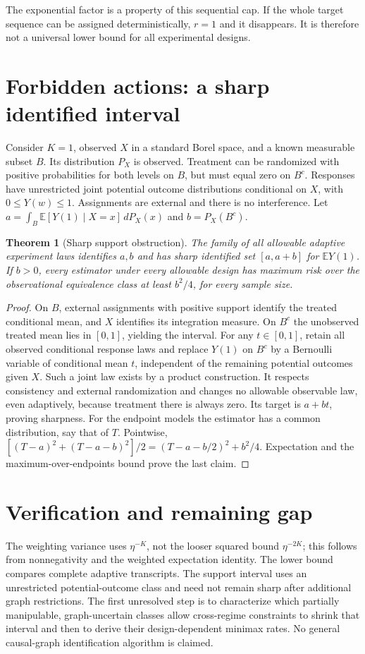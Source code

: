 \documentclass[11pt]{article}
\newtheorem{theorem}{Theorem}
\theoremstyle{remark}
\newcommand{\E}{\mathbb E}
\begin{document}
The exponential factor is a property of this sequential cap. If the whole
target sequence can be assigned deterministically, $r=1$ and it disappears.
It is therefore not a universal lower bound for all experimental designs.

\section{Forbidden actions: a sharp identified interval}
Consider $K=1$, observed $X$ in a standard Borel space, and a known
measurable subset $B$. Its distribution $P_X$ is observed. Treatment can
be randomized with positive probabilities for both levels on $B$, but
must equal zero on $B^c$. Responses have unrestricted joint potential
outcome distributions conditional on $X$, with $0\leq Y(w)\leq1$.
Assignments are external and there is no interference. Let
$a=\int_B \E[Y(1)\mid X=x]\,dP_X(x)$ and $b=P_X(B^c)$.

\begin{theorem}[Sharp support obstruction]
The family of all allowable adaptive experiment laws identifies $a,b$
and has sharp identified set $[a,a+b]$ for $\E Y(1)$. If $b>0$, every
estimator under every allowable design has maximum risk over the
observational equivalence class at least $b^2/4$, for every sample size.
\end{theorem}
\begin{proof}
On $B$, external assignments with positive support identify the treated
conditional mean, and $X$ identifies its integration measure. On $B^c$
the unobserved treated mean lies in $[0,1]$, yielding the interval.
For any $t\in[0,1]$, retain all observed conditional response laws and
replace $Y(1)$ on $B^c$ by a Bernoulli variable of conditional mean $t$,
independent of the remaining potential outcomes given $X$. Such a joint
law exists by a product construction. It respects consistency and
external randomization and changes no allowable observable law, even
adaptively, because treatment there is always zero. Its target is $a+bt$,
proving sharpness. For the endpoint models the estimator has a common
distribution, say that of $T$. Pointwise,
$[(T-a)^2+(T-a-b)^2]/2=(T-a-b/2)^2+b^2/4$.
Expectation and the maximum-over-endpoints bound prove the last claim.
\end{proof}

\section{Verification and remaining gap}
The weighting variance uses $\eta^{-K}$, not the looser squared bound
$\eta^{-2K}$; this follows from nonnegativity and the weighted expectation
identity. The lower bound compares complete adaptive transcripts. The
support interval uses an unrestricted potential-outcome class and need
not remain sharp after additional graph restrictions. The first unresolved
step is to characterize which partially manipulable, graph-uncertain
classes allow cross-regime constraints to shrink that interval and then
to derive their design-dependent minimax rates. No general causal-graph
identification algorithm is claimed.
\end{document}
